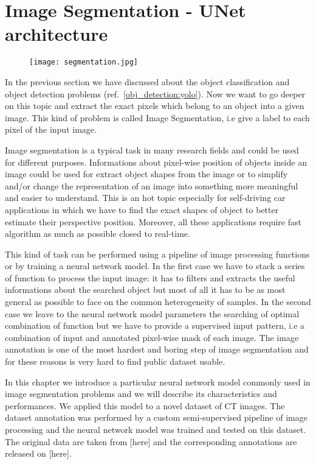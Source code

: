 \documentclass{standalone}
\begin{document}
\section[UNet]{Image Segmentation - UNet architecture}\label{segmentation:unet}

\begin{center}
\begin{figure}[htbp]
\centering
\texttt{[image: segmentation.jpg]}
\label{fig:segmentation}
\end{figure}
\end{center}

In the previous section we have discussed about the object classification and object detection problems (ref.~\ref{obj_detection:yolo}).
Now we want to go deeper on this topic and extract the exact pixels which belong to an object into a given image.
This kind of problem is called Image Segmentation, i.e give a label to each pixel of the input image.

Image segmentation is a typical task in many research fields and could be used for different purposes.
Informations about pixel-wise position of objects inside an image could be used for extract object shapes from the image or to simplify and/or change the representation of an image into something more meaningful and easier to understand.
This is an hot topic especially for self-driving car applications in which we have to find the exact shapes of object to better estimate their perspective position.
Moreover, all these applications require fast algorithm as much as possible closed to real-time.

This kind of task can be performed using a pipeline of image processing functions or by training a neural network model.
In the first case we have to stack a series of function to process the input image: it has to filters and extracts the useful informations about the searched object but most of all it has to be as most general as possible to face on the common heterogeneity of samples.
In the second case we leave to the neural network model parameters the searching of optimal combination of function but we have to provide a supervised input pattern, i.e a combination of input and annotated pixel-wise mask of each image.
The image annotation is one of the most hardest and boring step of image segmentation and for these reasons is very hard to find public dataset usable.

In this chapter we introduce a particular neural network model commonly used in image segmentation problems and we will describe its characteristics and performances.
We applied this model to a novel dataset of CT images.
The dataset annotation was performed by a custom semi-supervised pipeline of image processing and the neural network model was trained and tested on this dataset.
The original data are taken from [here] and the corresponding annotations are released on [here].
\end{document}
